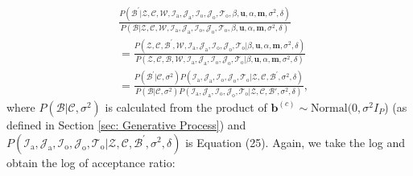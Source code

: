 \documentclass[a4paper]{article}
\begin{document}
 \begin{equation}
 \begin{aligned}
& \frac{P(\mathcal{B}^\prime|\mathcal{Z},   \mathcal{C},  \mathcal{W}, \mathcal{I}_{\mbox{a}}, \mathcal{J}_{\mbox{a}}, \mathcal{I}_{\mbox{o}}, \mathcal{J}_{\mbox{o}}, \mathcal{T}_{\mbox{o}}, \beta, \boldsymbol{u}, \alpha, \boldsymbol{m}, \sigma^2, \delta)}{P(\mathcal{B}|\mathcal{Z},   \mathcal{C},  \mathcal{W}, \mathcal{I}_{\mbox{a}}, \mathcal{J}_{\mbox{a}},\mathcal{I}_{\mbox{o}}, \mathcal{J}_{\mbox{o}}, \mathcal{T}_{\mbox{o}}, \beta, \boldsymbol{u}, \alpha, \boldsymbol{m}, \sigma^2, \delta)}\\&=\frac{P(\mathcal{Z}, \mathcal{C}, \mathcal{B}^\prime, \mathcal{W}, \mathcal{I}_{\mbox{a}}, \mathcal{J}_{\mbox{a}}, \mathcal{I}_{\mbox{o}}, \mathcal{J}_{\mbox{o}}, \mathcal{T}_{\mbox{o}} |\beta, \boldsymbol{u}, \alpha, \boldsymbol{m}, \sigma^2, \delta)}{P(\mathcal{Z}, \mathcal{C}, \mathcal{B}, \mathcal{W}, \mathcal{I}_{\mbox{a}}, \mathcal{J}_{\mbox{a}}, \mathcal{I}_{\mbox{o}}, \mathcal{J}_{\mbox{o}}, \mathcal{T}_{\mbox{o}} |\beta, \boldsymbol{u}, \alpha, \boldsymbol{m}, \sigma^2,  \delta)}\\&=\frac{P(\mathcal{B}^\prime|\mathcal{C}, \sigma^2)P(\mathcal{I}_{\mbox{a}}, \mathcal{J}_{\mbox{a}}, \mathcal{I}_{\mbox{o}}, \mathcal{J}_{\mbox{o}}, \mathcal{T}_{\mbox{o}} |\mathcal{Z}, \mathcal{C}, \mathcal{B}^\prime, \sigma^2, \delta)}{P(\mathcal{B}|\mathcal{C}, \sigma^2)P(\mathcal{I}_{\mbox{a}}, \mathcal{J}_{\mbox{a}}, \mathcal{I}_{\mbox{o}}, \mathcal{J}_{\mbox{o}}, \mathcal{T}_{\mbox{o}} |\mathcal{Z}, \mathcal{C}, \mathcal{B}\prime, \sigma^2, \delta)},
 \end{aligned}
 \end{equation}
 where $P(\mathcal{B}|\mathcal{C}, \sigma^2)$ is calculated from the product of $\boldsymbol{b}^{(c)}\sim \mbox{Normal}(0, \sigma^2 I_P$) (as defined in Section \ref{sec: Generative Process}) and $P(\mathcal{I}_{\mbox{a}}, \mathcal{J}_{\mbox{a}}, \mathcal{I}_{\mbox{o}}, \mathcal{J}_{\mbox{o}}, \mathcal{T}_{\mbox{o}} |\mathcal{Z}, \mathcal{C}, \mathcal{B}^\prime, \sigma^2, \delta)$ is Equation (25). Again, we take the log and obtain the log of acceptance ratio:
\end{document}
